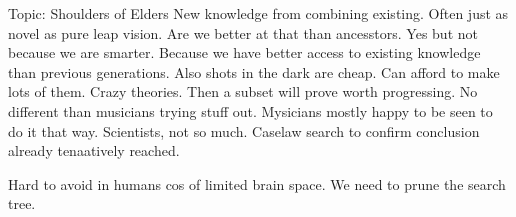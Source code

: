 Topic: Shoulders of Elders
		New knowledge from combining existing. Often just as novel as pure leap vision.
		Are we better at that than ancesstors. Yes but not because we are smarter. Because we have better access to existing knowledge than previous generations.
		Also shots in the dark are cheap. Can afford to make lots of them. Crazy theories. Then a subset will prove worth progressing. No different than musicians trying stuff out. Mysicians mostly happy to be seen to do it that way. Scientists, not 	so much.
		Caselaw search to confirm conclusion already tenaatively reached.

		Hard to avoid in humans cos of limited brain space. We need to prune the search tree.


